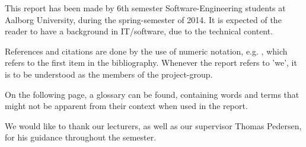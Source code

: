 This report has been made by 6th semester Software-Engineering students at Aalborg University, during the spring-semester of 2014.
It is expected of the reader to have a background in IT/software, due to the technical content.

References and citations are done by the use of numeric notation, e.g. \cite{music-and-computers}, which refers to the first item in the bibliography.
Whenever the report refers to 'we', it is to be understood as the members of the project-group.

On the following page, a glossary can be found, containing words and terms that might not be apparent from their context when used in the report.

We would like to thank our lecturers, as well as our supervisor Thomas Pedersen, for his guidance throughout the semester.